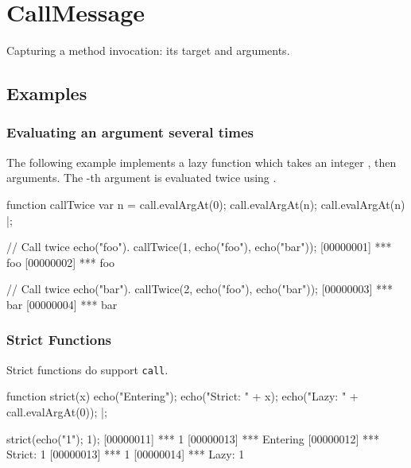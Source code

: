 
\section{CallMessage}
Capturing a method invocation: its target and arguments.

\subsection{Examples}
\subsubsection{Evaluating an argument several times}
\label{sec:std-callmsg-examples-several}

The following example implements a lazy function which takes an integer
, then arguments.  The -th argument is evaluated twice using
.

\begin{urbiscript}[firstnumber=1]
function callTwice
{
  var n = call.evalArgAt(0);
  call.evalArgAt(n);
  call.evalArgAt(n)
} |;

// Call twice echo("foo").
callTwice(1, echo("foo"), echo("bar"));
[00000001] *** foo
[00000002] *** foo

// Call twice echo("bar").
callTwice(2, echo("foo"), echo("bar"));
[00000003] *** bar
[00000004] *** bar
\end{urbiscript}


\subsubsection{Strict Functions}

Strict functions do support \lstinline|call|.

\begin{urbiscript}
function strict(x)
{
  echo("Entering");
  echo("Strict: " + x);
  echo("Lazy:   " + call.evalArgAt(0));
} |;

strict({echo("1"); 1});
[00000011] *** 1
[00000013] *** Entering
[00000012] *** Strict: 1
[00000013] *** 1
[00000014] *** Lazy:   1
\end{urbiscript}


